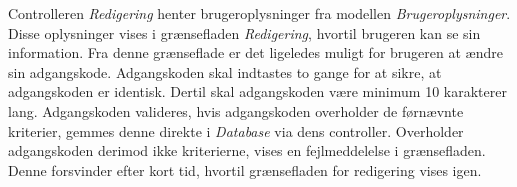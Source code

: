 \noindent
Controlleren \textit{Redigering} henter brugeroplysninger fra modellen \textit{Brugeroplysninger}. Disse oplysninger vises i grænsefladen \textit{Redigering}, hvortil brugeren kan se sin information. Fra denne grænseflade er det ligeledes muligt for brugeren at ændre sin adgangskode. Adgangskoden skal indtastes to gange for at sikre, at adgangskoden er identisk. Dertil skal adgangskoden være minimum 10 karakterer lang. Adgangskoden valideres, hvis adgangskoden overholder de førnævnte kriterier, gemmes denne direkte i \textit{Database} via dens controller.
Overholder adgangskoden derimod ikke kriterierne, vises en fejlmeddelelse i grænsefladen. Denne forsvinder efter kort tid, hvortil grænsefladen for redigering vises igen. 
